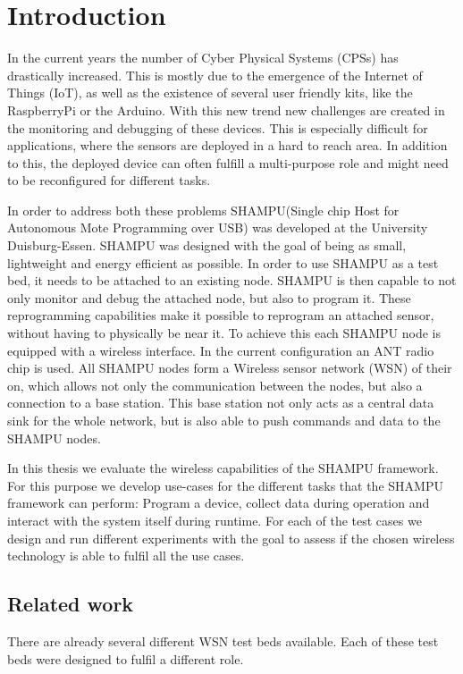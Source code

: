 \chapter{Introduction}
\label{sec:intro}
In the current years the number of Cyber Physical Systems (CPSs) has drastically increased. This is mostly due to the emergence of the Internet of Things (IoT), as well as the existence of several user friendly kits, like the RaspberryPi or the Arduino. With this new trend new challenges are created in the monitoring and debugging of these devices. This is especially difficult for applications, where the sensors are deployed in a hard to reach area. In addition to this, the deployed device can often fulfill a multi-purpose role and might need to be reconfigured for different tasks.

In order to address both these problems SHAMPU(Single chip Host for Autonomous Mote Programming over USB)\cite{smeets2014demonstration} was developed at the University Duisburg-Essen. SHAMPU was designed with the goal of being as small, lightweight and energy efficient as possible. In order to use SHAMPU as a test bed, it needs to be attached to an existing node. SHAMPU is then capable to not only monitor and debug the attached node, but also to program it. These reprogramming capabilities make it possible to reprogram an attached sensor, without having to physically be near it. To achieve this each SHAMPU node is equipped with a wireless interface. In the current configuration an ANT\cite{DynastreamInnovationsInc.2013} radio chip is used. All SHAMPU nodes form a Wireless sensor network (WSN) of their on, which allows not only the communication between the nodes, but also a connection to a base station. This base station not only acts as a central data sink for the whole network, but is also able to push commands and data to the SHAMPU nodes.

In this thesis we evaluate the wireless capabilities of the SHAMPU framework. For this purpose we develop use-cases for the different tasks that the SHAMPU framework can perform: Program a device, collect data during operation and interact with the system itself during runtime. For each of the test cases we design and run different experiments with the goal to assess if the chosen wireless technology is able to fulfil all the use cases.

\section{Related work}
\label{sec:related_work}
There are already several different WSN test beds available. Each of these test beds were designed to fulfil a different role. 

